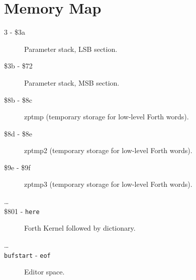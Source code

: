 \chapter{Memory Map}

\begin{description}
\item[3 - \$3a] Parameter stack, LSB section.
\item[\$3b - \$72] Parameter stack, MSB section.
\item[\$8b - \$8c] zptmp (temporary storage for low-level Forth words).
\item[\$8d - \$8e] zptmp2 (temporary storage for low-level Forth words).
\item[\$9e - \$9f] zptmp3 (temporary storage for low-level Forth words).
\item[\ldots]
\item[\$801 - \texttt{here}] Forth Kernel followed by dictionary.
\item[\ldots]
\item[\texttt{bufstart} - \texttt{eof}] Editor space.
\end{description}

